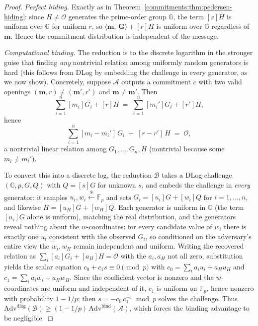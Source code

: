 \documentclass[11pt,a4paper]{article}
\theoremstyle{definition}
\theoremstyle{remark}
\newcommand{\G}{\ensuremath{\mathbb{G}}}
\newcommand{\Fp}{\ensuremath{\mathbb{F}_{p}}}
\newcommand{\ip}[2]{\langle #1,\, #2 \rangle}
\begin{document}
\begin{proof}
\emph{Perfect hiding.} Exactly as in Theorem~\ref{commitments:thm:pedersen-hiding}: since \(H \neq \mathcal{O}\) generates the prime-order group \(\G\), the term \([r]H\) is uniform over \(\G\) for uniform \(r\), so \(\ip{\mathbf{m}}{\mathbf{G}} + [r]H\) is uniform over \(\G\) regardless of \(\mathbf{m}\). Hence the commitment distribution is independent of the message.

\emph{Computational binding.} The reduction is to the discrete logarithm in the stronger guise that finding \emph{any} nontrivial relation among uniformly random generators is hard (this follows from DLog by embedding the challenge in every generator, as we now show). Concretely, suppose \(\mathcal{A}\) outputs a commitment \(c\) with two valid openings \((\mathbf{m}, r) \neq (\mathbf{m}', r')\) and \(\mathbf{m} \neq \mathbf{m}'\). Then
\[
  \sum_{i=1}^n [m_i]G_i + [r]H \;=\; \sum_{i=1}^n [m_i']G_i + [r']H,
\]
hence
\[
  \sum_{i=1}^n [m_i - m_i']\,G_i \;+\; [r - r']\,H \;=\; \mathcal{O},
\]
a nontrivial linear relation among \(G_1, \dots, G_n, H\) (nontrivial because some \(m_i \neq m_i'\)). 

To convert this into a discrete log, the reduction \(\mathcal{B}\) takes a DLog challenge \((\G, p, G, Q)\) with \(Q = [s]G\) for unknown \(s\), and embeds the challenge in \emph{every} generator: it samples \(u_i, w_i \xleftarrow{\$} \Fp\) and sets \(G_i = [u_i]G + [w_i]Q\) for \(i = 1, \dots, n\), and likewise \(H = [u_H]G + [w_H]Q\). Each generator is uniform in \(\G\) (the term \([u_i]G\) alone is uniform), matching the real distribution, and the generators reveal nothing about the \(w\)-coordinates: for every candidate value of \(w_i\) there is exactly one \(u_i\) consistent with the observed \(G_i\), so conditioned on the adversary's entire view the \(w_i, w_H\) remain independent and uniform. Writing the recovered relation as \(\sum_i [a_i] G_i + [a_H] H = \mathcal{O}\) with the \(a_i, a_H\) not all zero, substitution yields the scalar equation \(c_0 + c_1 s \equiv 0 \pmod p\) with \(c_0 = \sum_i a_i u_i + a_H u_H\) and \(c_1 = \sum_i a_i w_i + a_H w_H\). Since the coefficient vector is nonzero and the \(w\)-coordinates are uniform and independent of it, \(c_1\) is uniform on \(\Fp\), hence nonzero with probability \(1 - 1/p\); then \(s = -c_0\, c_1^{-1} \bmod p\) solves the challenge. Thus \(\mathrm{Adv}^{\mathrm{dlog}}(\mathcal{B}) \ge (1 - 1/p)\,\mathrm{Adv}^{\mathrm{bind}}(\mathcal{A})\), which forces the binding advantage to be negligible.
\end{proof}
\end{document}
